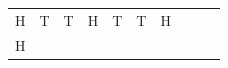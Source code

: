 {\begin{tabular}[t]{|l|l|l|l|l|l|l|l|l|l|}
    
        H &
    
    
        T &
    
    
        T &
    
    
        H &
    
    
        T &
    
    
        T &
    
    
        H%
     \tabularnewline\cline{1-1}\cline{2-2}\cline{3-3}\cline{4-4}\cline{5-5}\cline{6-6}\cline{7-7}\cline{8-8}\cline{9-9}\cline{10-10}
    
    
        H &
    
    

\end{tabular}}

